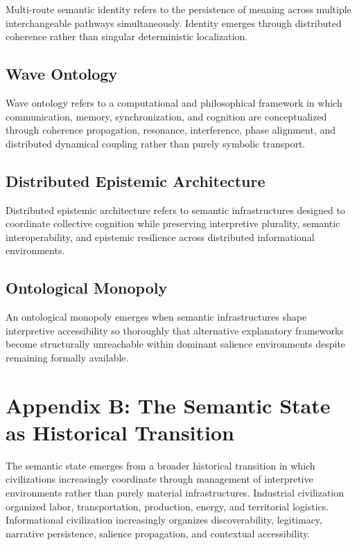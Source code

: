 \documentclass[11pt,a4paper]{article}
\begin{document}
Multi-route semantic identity refers to the persistence of meaning across multiple interchangeable pathways simultaneously. Identity emerges through distributed coherence rather than singular deterministic localization.

\subsection{Wave Ontology}

Wave ontology refers to a computational and philosophical framework in which communication, memory, synchronization, and cognition are conceptualized through coherence propagation, resonance, interference, phase alignment, and distributed dynamical coupling rather than purely symbolic transport.

\subsection{Distributed Epistemic Architecture}

Distributed epistemic architecture refers to semantic infrastructures designed to coordinate collective cognition while preserving interpretive plurality, semantic interoperability, and epistemic resilience across distributed informational environments.

\subsection{Ontological Monopoly}

An ontological monopoly emerges when semantic infrastructures shape interpretive accessibility so thoroughly that alternative explanatory frameworks become structurally unreachable within dominant salience environments despite remaining formally available.

\section{Appendix B: The Semantic State as Historical Transition}

The semantic state emerges from a broader historical transition in which civilizations increasingly coordinate through management of interpretive environments rather than purely material infrastructures. Industrial civilization organized labor, transportation, production, energy, and territorial logistics. Informational civilization increasingly organizes discoverability, legitimacy, narrative persistence, salience propagation, and contextual accessibility.
\end{document}
